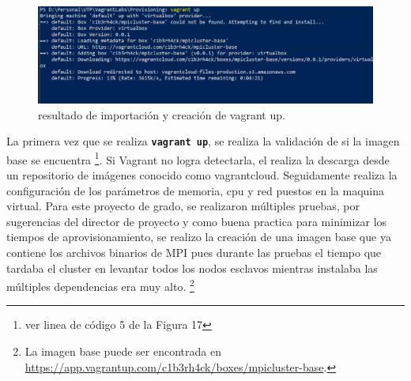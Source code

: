\documentclass[letterpaper, 12pt, oneside]{article}
\begin{document}
    
    \begin{figure}[H]
        \includegraphics[scale=0.7]{img/provision/vagrantbox2.png}
        \caption{resultado de importación y creación de vagrant up.}
        \label{fig:va6}
    \end{figure}
    La primera vez que se realiza \textbf{\texttt{vagrant up}}, se realiza la validación de si la imagen base se encuentra \footnote{ver linea de código 5 de la Figura 17}. Si Vagrant no logra detectarla, el realiza la descarga desde un repositorio de imágenes conocido como vagrantcloud. Seguidamente realiza la configuración de los parámetros de memoria, cpu y red puestos en la maquina virtual. Para este proyecto de grado, se realizaron múltiples pruebas, por sugerencias del director de proyecto y como buena practica para minimizar los tiempos de aprovisionamiento, se realizo la creación de una imagen base que ya contiene los archivos binarios de MPI pues durante las pruebas el tiempo que tardaba el cluster en levantar todos los nodos esclavos mientras instalaba las múltiples dependencias era muy alto. \footnote{La imagen base puede ser encontrada en \url{https://app.vagrantup.com/c1b3rh4ck/boxes/mpicluster-base}. }
    
\end{document}
